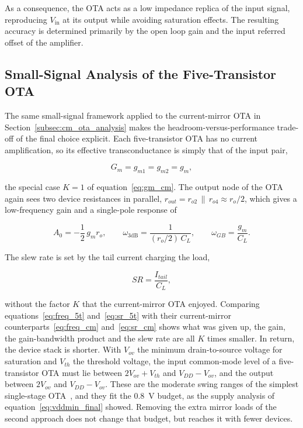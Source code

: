 As a consequence, the OTA acts as a low impedance replica of the input signal, reproducing $V_\mathrm{in}$ at its output while avoiding saturation effects. The resulting accuracy is determined primarily by the open loop gain and the input referred offset of the amplifier.

\subsection{Small-Signal Analysis of the Five-Transistor OTA}
\label{subsec:5t_analysis}

The same small-signal framework applied to the current-mirror OTA in
Section~\ref{subsec:cm_ota_analysis} makes the headroom-versus-performance
trade-off of the final choice explicit. Each five-transistor OTA has no current
amplification, so its effective transconductance is simply that of the input
pair,

\begin{equation}
    G_m = g_{m1} = g_{m2} = g_m,
    \label{eq:gm_5t}
\end{equation}

\noindent
the special case $K = 1$ of equation~\eqref{eq:gm_cm}. The output node of the OTA again
sees two device resistances in parallel, $r_{out} = r_{o2} \,\|\, r_{o4}
\approx r_{o}/2$, which gives a low-frequency gain and a single-pole response
of

\begin{equation}
    A_0 = -\frac{1}{2}\,g_m r_{o},
    \qquad
    \omega_{3\mathrm{dB}} = \frac{1}{(r_{o}/2)\,C_L},
    \qquad
    \omega_{GB} = \frac{g_m}{C_L}.
    \label{eq:freq_5t}
\end{equation}

\noindent
The slew rate is set by the tail current charging the load,

\begin{equation}
    SR = \frac{I_{tail}}{C_L},
    \label{eq:sr_5t}
\end{equation}

\noindent
without the factor $K$ that the current-mirror OTA enjoyed. Comparing
equations~\eqref{eq:freq_5t} and~\eqref{eq:sr_5t} with their current-mirror
counterparts~\eqref{eq:freq_cm} and~\eqref{eq:sr_cm} shows what was given up,
the gain, the gain-bandwidth product and the slew rate are all $K$ times
smaller. In return, the device stack is shorter. With $V_{ov}$
the minimum drain-to-source voltage for saturation and $V_{th}$ the threshold
voltage, the input common-mode level of a five-transistor OTA must lie between
$2V_{ov} + V_{th}$ and $V_{DD} - V_{ov}$, and the output between
$2V_{ov}$ and $V_{DD} - V_{ov}$. These are the moderate swing ranges of
the simplest single-stage OTA~\cite{choi2023}, and they fit the $0.8$~V budget,
as the supply analysis of equation~\eqref{eq:vddmin_final} showed. Removing the
extra mirror loads of the second approach does not change that budget, but
reaches it with fewer devices.

